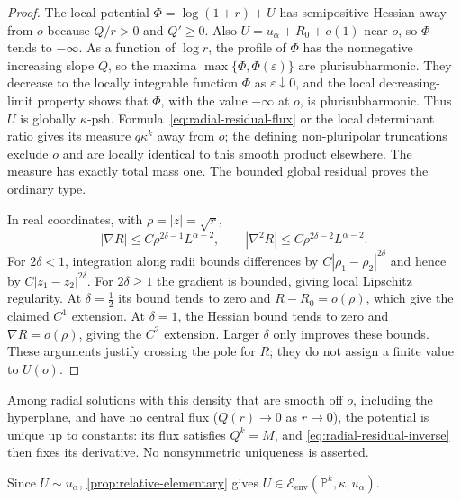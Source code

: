 \begin{proof}
The local potential $\Phi=\log(1+r)+U$ has semipositive
Hessian away from $o$ because $Q/r>0$ and $Q'\ge0$. Also
$U=u_\alpha+R_0+o(1)$ near $o$, so $\Phi$ tends to $-\infty$.
As a function of $\log r$, the profile of $\Phi$ has the nonnegative increasing slope $Q$, so the maxima $\max\{\Phi,\Phi(\varepsilon)\}$ are plurisubharmonic. They decrease to the locally integrable function $\Phi$ as $\varepsilon\downarrow0$, and the local decreasing-limit property shows that $\Phi$, with the value $-\infty$ at $o$, is plurisubharmonic. Thus $U$ is globally
$\kappa$-psh. Formula~\eqref{eq:radial-residual-flux} or the local determinant
ratio gives its measure $q\kappa^k$ away from $o$; the defining
non-pluripolar truncations exclude $o$ and are locally identical
to this smooth product elsewhere. The measure has exactly total
mass one. The bounded global residual proves the ordinary type.

In real coordinates, with $\rho=|z|=\sqrt r$,
\[
 |\nabla R|\le C\rho^{2\delta-1}L^{\alpha-2},
 \qquad |\nabla^2R|\le C\rho^{2\delta-2}L^{\alpha-2}.
\]
For $2\delta<1$, integration along radii bounds differences
by $C|\rho_1-\rho_2|^{2\delta}$ and hence by
$C|z_1-z_2|^{2\delta}$. For $2\delta\ge1$ the gradient is bounded,
giving local Lipschitz regularity. At $\delta=\frac12$ its bound
tends to zero and $R-R_0=o(\rho)$, which give the claimed $C^1$
extension. At $\delta=1$, the Hessian bound tends to zero and
$\nabla R=o(\rho)$, giving the $C^2$ extension. Larger $\delta$
only improves these bounds. These arguments justify crossing the
pole for $R$; they do not assign a finite value to $U(o)$.
\end{proof}

Among radial solutions with this density that are smooth off $o$,
including the hyperplane, and have no central flux ($Q(r)\to0$ as $r\to0$),
the potential is unique up to constants: its flux satisfies
$Q^k=M$, and \eqref{eq:radial-residual-inverse} then fixes its derivative.
No nonsymmetric uniqueness is asserted.

Since $U\sim u_\alpha$, \cref{prop:relative-elementary} gives $U\in\mathcal E_{\mathrm{env}}(\mathbb P^k,\kappa,u_\alpha)$.

